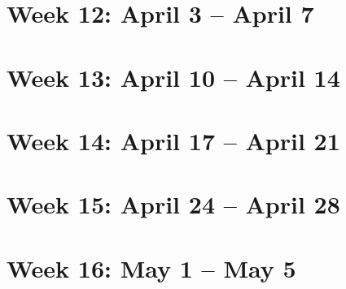 \section{Week 12: April 3 -- April 7}

\section{Week 13: April 10 -- April 14}

\section{Week 14: April 17 -- April 21}

\section{Week 15: April 24 -- April 28}

\section{Week 16: May 1 -- May 5}
